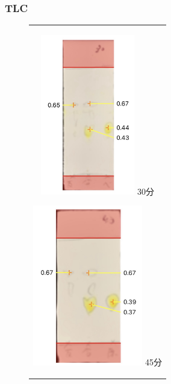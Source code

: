\documentclass[a4paper,papersize,dvipdfmx]{jsarticle}
\begin{document}
\subsubsection*{TLC}
\begin{figure}[H]
\begin{center}
\begin{tabular}{c}

\begin{minipage}{0.22\hsize}
\begin{center}
\includegraphics[clip, height=7cm]{imgs/3-tlc1.jpg}
\hspace{1.6cm} 30分
\end{center}
\end{minipage}

\begin{minipage}{0.05\hsize}
\hspace{2mm}
\end{minipage}

\begin{minipage}{0.22\hsize}
\begin{center}
\includegraphics[clip, height=7cm]{imgs/3-tlc2.jpg}
\hspace{1.6cm} 45分
\end{center}
\end{minipage}

\end{tabular}
\end{center}
\end{figure}
\end{document}
